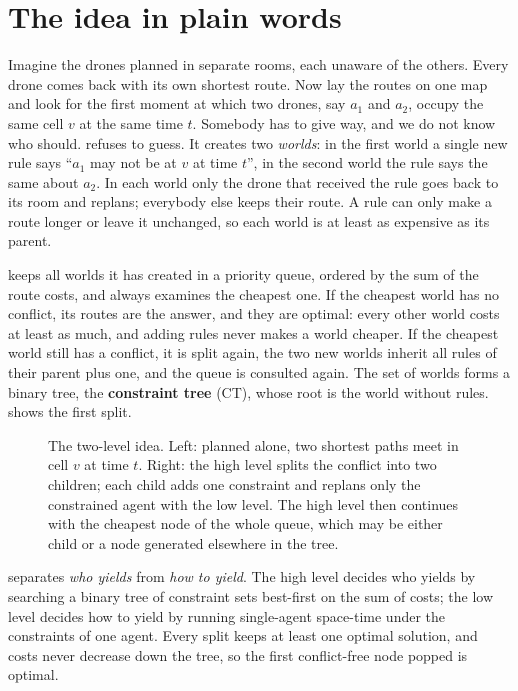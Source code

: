 \section{The idea in plain words}
\label{sec:ch09-intuition}

Imagine the drones planned in separate rooms, each unaware of the others.
Every drone comes back with its own shortest route. Now lay the routes on one
map and look for the first moment at which two drones, say $a_1$ and $a_2$,
occupy the same cell $v$ at the same time $t$. Somebody has to give way, and
we do not know who should. \cbs refuses to guess. It creates two
\emph{worlds}: in the first world a single new rule says ``$a_1$ may not be
at $v$ at time $t$'', in the second world the rule says the same about $a_2$.
In each world only the drone that received the rule goes back to its room and
replans; everybody else keeps their route. A rule can only make a route
longer or leave it unchanged, so each world is at least as expensive as its
parent.

\cbs keeps all worlds it has created in a priority queue, ordered by the sum
of the route costs, and always examines the cheapest one. If the cheapest
world has no conflict, its routes are the answer, and they are optimal: every
other world costs at least as much, and adding rules never makes a world
cheaper. If the cheapest world still has a conflict, it is split again, the
two new worlds inherit all rules of their parent plus one, and the queue is
consulted again. The set of worlds forms a binary tree, the
\textbf{constraint tree} (CT), whose root is the world
without rules.  shows the first split.

\begin{figure}[tb]
  \centering
  \caption{The two-level idea. Left: planned alone, two shortest paths meet
    in cell $v$ at time $t$. Right: the high level splits the conflict into
    two children; each child adds one constraint and replans only the
    constrained agent with the low level. The high level then continues with
    the cheapest node of the whole queue, which may be either child or a
    node generated elsewhere in the tree.}
  \label{fig:ch09-idea}
\end{figure}

\begin{keyidea}
\cbs separates \emph{who yields} from \emph{how to yield}. The high level
decides who yields by searching a binary tree of constraint sets best-first
on the sum of costs; the low level decides how to yield by running
single-agent space-time \astar under the constraints of one agent. Every
split keeps at least one optimal solution, and costs never decrease down the
tree, so the first conflict-free node popped is optimal.
\end{keyidea}

